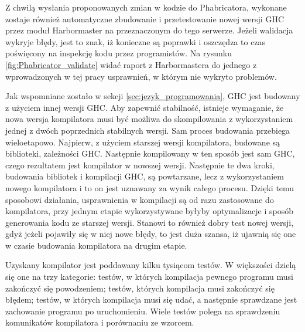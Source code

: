 Z chwilą wysłania proponowanych zmian w kodzie do Phabricatora, wykonane zostaje również automatyczne zbudowanie i przetestowanie nowej wersji GHC przez moduł Harbormaster na przeznaczonym do tego serwerze. Jeżeli walidacja wykryje błędy, jest to znak, iż konieczne są poprawki i oszczędza to czas poświęcony na inspekcję kodu przez programistów. Na rysunku \ref{fig:Phabricator_validate} widać raport z Harbormastera do jednego z wprowadzonych w tej pracy usprawnień, w którym nie wykryto problemów.

Jak wspomniane zostało w sekcji \ref{sec:jezyk_programowania}, GHC jest budowany z użyciem innej wersji GHC. Aby zapewnić stabilność, istnieje wymaganie, że nowa wersja kompilatora musi być możliwa do skompilowania z wykorzystaniem jednej z dwóch poprzednich stabilnych wersji\cite{WikiFixingBugs}. Sam proces budowania przebiega wieloetapowo. Najpierw, z użyciem starszej wersji kompilatora, budowane są biblioteki, zależności GHC. Następnie kompilowany w ten sposób jest sam GHC, czego rezultatem jest kompilator w nowszej wersji. Następnie te dwa kroki, budowania bibliotek i kompilacji GHC, są powtarzane, lecz z wykorzystaniem nowego kompilatora i to on jest uznawany za wynik całego procesu\cite{WikiBuildSystem}. Dzięki temu sposobowi działania, usprawnienia w kompilacji są od razu zastosowane do kompilatora, przy jednym etapie wykorzystywane byłyby optymalizacje i sposób generowania kodu ze starszej wersji. Stanowi to również dobry test nowej wersji, gdyż jeżeli pojawiły się w niej nowe błędy, to jest duża szansa, iż ujawnią się one w czasie budowania kompilatora na drugim etapie.

Uzyskany kompilator jest poddawany kilku tysiącom testów. W większości dzielą się one na trzy kategorie: testów, w których kompilacja pewnego programu musi zakończyć się powodzeniem; testów, których kompilacja musi zakończyć się błędem; testów, w których kompilacja musi się udać, a następnie sprawdzane jest zachowanie programu po uruchomieniu. Wiele testów polega na sprawdzeniu komunikatów kompilatora i porównaniu ze wzorcem.
